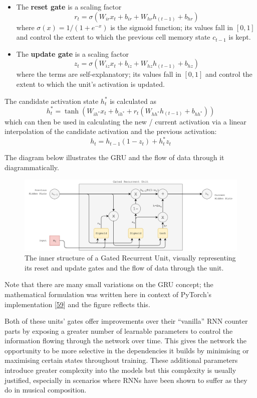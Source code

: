 \documentclass[12pt,]{article}
\providecommand{\tightlist}{%
  \setlength{\itemsep}{0pt}\setlength{\parskip}{0pt}}
\begin{document}
\begin{itemize}
\tightlist
\item
  The \textbf{reset gate} is a scaling factor
  \[r_t = \sigma(W_{ir} x_t + b_{ir} + W_{hr} h_{(t-1)} + b_{hr})\]
  where \(\sigma(x) = 1 / (1 + e^{-x})\) is the sigmoid function; its
  values fall in \([0,1]\) and control the extent to which the previous
  cell memory state \(c_{t-1}\) is kept.
\item
  The \textbf{update gate} is a scaling factor
  \[z_t = \sigma(W_{iz} x_t + b_{iz} + W_{hz} h_{(t-1)} + b_{hz})\]
  where the terms are self-explanatory; its values fall in \([0,1]\) and
  control the extent to which the unit's activation is updated.
\end{itemize}

The candidate activation state \(h_t^*\) is calculated as
\[h_t^* = \tanh(W_{ih^*} x_t + b_{ih^*} + r_t (W_{hh^*} h_{(t-1)} + b_{hh^*}))\]
which can then be used in calculating the new / current activation via a
linear interpolation of the candidate activation and the previous
activation: \[h_t = h_{t-1} (1 - z_t) + h_t^* z_t\]

The diagram below illustrates the GRU and the flow of data through it
diagrammatically.

\begin{figure}
\centering
\includegraphics{Images/gru.png}
\caption{The inner structure of a Gated Recurrent Unit, visually
representing its reset and update gates and the flow of data through the
unit.}
\end{figure}

Note that there are many small variations on the GRU concept; the
mathematical formulation was written here in context of PyTorch's
implementation {[}\protect\hyperlink{ref-pytorchgru}{59}{]} and the
figure reflects this.

Both of these units' gates offer improvements over their ``vanilla'' RNN
counter parts by exposing a greater number of learnable parameters to
control the information flowing through the network over time. This
gives the network the opportunity to be more selective in the
dependencies it builds by minimising or maximising certain states
throughout training. These additional parameters introduce greater
complexity into the models but this complexity is usually justified,
especially in scenarios where RNNs have been shown to suffer as they do
in musical composition.
\end{document}
